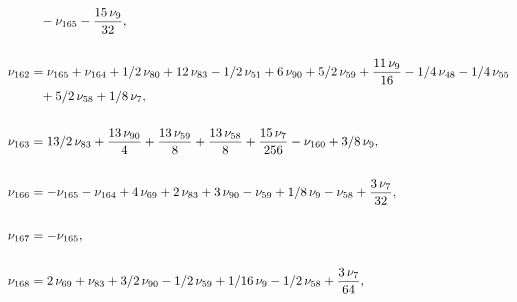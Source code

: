 \documentclass[a4paper,12pt, DIV=14, BCOR=5mm, twoside, headsepline]{scrbook}
\begin{document}
\begin{align}
\begin{aligned}
 &\hphantom{=}-\nu_{{165}
}-{\frac {15\,\nu_{{9}}}{32}}, \\
\\
\nu_{{162}}&=\nu_{{165}}+\nu_{{164}}+1/2
\,\nu_{{80}}+12\,\nu_{{83}}-1/2\,\nu_{{51}}+6\,\nu_{{90}}+5/2\,\nu_{{
59}}+{\frac {11\,\nu_{{9}}}{16}}-1/4\,\nu_{{48}}-1/4\,\nu_{{55}}\\
 &\hphantom{=}+5/2\,
\nu_{{58}}+1/8\,\nu_{{7}}, \\
\\
\nu_{{163}}&=13/2\,\nu_{{83}}+{\frac {13\,\nu
_{{90}}}{4}}+{\frac {13\,\nu_{{59}}}{8}}+{\frac {13\,\nu_{{58}}}{8}}+{
\frac {15\,\nu_{{7}}}{256}}-\nu_{{160}}+3/8\,\nu_{{9}}, \\
\\
\nu_{{166}}&=-
\nu_{{165}}-\nu_{{164}}+4\,\nu_{{69}}+2\,\nu_{{83}}+3\,\nu_{{90}}-\nu_
{{59}}+1/8\,\nu_{{9}}-\nu_{{58}}+{\frac {3\,\nu_{{7}}}{32}}, \\
\\
\nu_{{167}
}&=-\nu_{{165}}, \\
\\
\nu_{{168}}&=2\,\nu_{{69}}+\nu_{{83}}+3/2\,\nu_{{90}}-1/
2\,\nu_{{59}}+1/16\,\nu_{{9}}-1/2\,\nu_{{58}}+{\frac {3\,\nu_{{7}}}{64
}}, 
\end{aligned}
\end{align}
\end{document}
